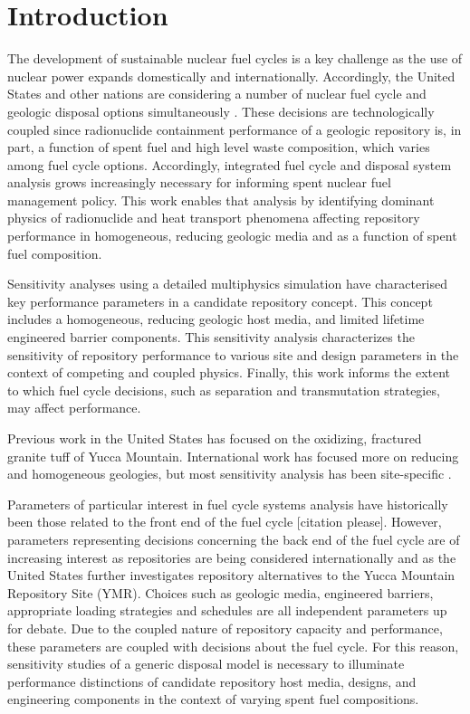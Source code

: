 
\section{Introduction}

The development of sustainable nuclear fuel cycles is a key challenge as the use 
of nuclear power expands domestically and internationally. Accordingly, the 
United States and other nations are considering a number of nuclear fuel cycle 
and geologic disposal options simultaneously \cite{}. These decisions are 
technologically coupled since radionuclide containment performance of a geologic 
repository is, in part, a function of spent fuel and high level waste 
composition, which varies among fuel cycle options. Accordingly, integrated 
fuel cycle and disposal system analysis grows increasingly necessary for 
informing spent nuclear fuel management policy.  This work enables that analysis 
by identifying dominant physics of radionuclide and heat transport phenomena 
affecting repository performance in homogeneous, reducing geologic media and as 
a function of spent fuel composition. 

Sensitivity analyses using a detailed multiphysics simulation have characterised 
key performance parameters in a candidate repository concept. This concept 
includes a homogeneous, reducing geologic host media, and limited lifetime 
engineered barrier components.  This sensitivity analysis characterizes the 
sensitivity of repository performance to various site and design parameters in 
the context of competing and coupled physics. Finally, this work informs the 
extent to which fuel cycle decisions, such as separation and transmutation 
strategies, may affect performance.


Previous work in the United States has focused on the oxidizing, fractured 
granite tuff of Yucca Mountain. International work has focused more on reducing 
and homogeneous geologies, but most sensitivity analysis has been site-specific \cite{von_lensa_red-impact_2008}.

Parameters of particular interest in fuel cycle systems analysis have 
historically been those related to the front end of the fuel cycle [citation 
please]. However, parameters representing decisions concerning the back end of 
the fuel cycle are of increasing interest as repositories are being considered 
internationally and as the United States further investigates repository 
alternatives to the Yucca Mountain Repository Site (YMR). Choices such as 
geologic media, engineered barriers, appropriate loading strategies and 
schedules are all independent parameters up for debate. Due to the coupled 
nature of repository capacity and performance, these parameters are coupled with 
decisions about the fuel cycle.  For this reason, sensitivity studies of a 
generic disposal model is necessary to illuminate performance distinctions of 
candidate repository host media, designs, and engineering components in the 
context of varying spent fuel compositions. 
